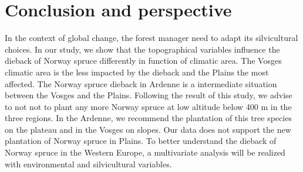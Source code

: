 \documentclass[3p,procedia]{elsarticle}
\begin{document}
 

 

 
\section{Conclusion and perspective}

In the context of global change, the forest manager need to adapt its silvicultural choices.
In our study, we show that the topographical variables influence the dieback of Norway spruce differently  in function of climatic area.
The Vosges climatic area is the less impacted by the dieback and the Plains the most affected.
The Norway spruce dieback in Ardenne is a intermediate situation between the Vosges and the Plains.
Following the result of this study, we advise to not  not to plant any more Norway spruce at low altitude below 400 m in the three regions.
In the Ardenne, we recommend the plantation of this tree species on the plateau and in the Vosges on slopes. 
Our data does not support the new plantation of Norway spruce in Plains.
To better understand the dieback of Norway spruce in the Western Europe, a multivariate analysis will be realized with environmental and silvicultural variables.


	

\end{document}
